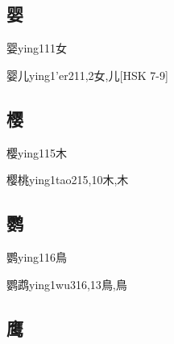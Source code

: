 \subsection*{婴}

\begin{EntryWithPhonetic}{婴}{ying1}{11}{⼥}
\end{EntryWithPhonetic}

\begin{EntryWithPhonetic}{婴儿}{ying1'er2}{11,2}{⼥,⼉}[HSK 7-9]
\end{EntryWithPhonetic}

\subsection*{樱}

\begin{EntryWithPhonetic}{樱}{ying1}{15}{⽊}
\end{EntryWithPhonetic}

\begin{EntryWithPhonetic}{樱桃}{ying1tao2}{15,10}{⽊,⽊}
\end{EntryWithPhonetic}

\subsection*{鹦}

\begin{EntryWithPhonetic}{鹦}{ying1}{16}{⿃}
\end{EntryWithPhonetic}

\begin{EntryWithPhonetic}{鹦鹉}{ying1wu3}{16,13}{⿃,⿃}
\end{EntryWithPhonetic}

\subsection*{鹰}

